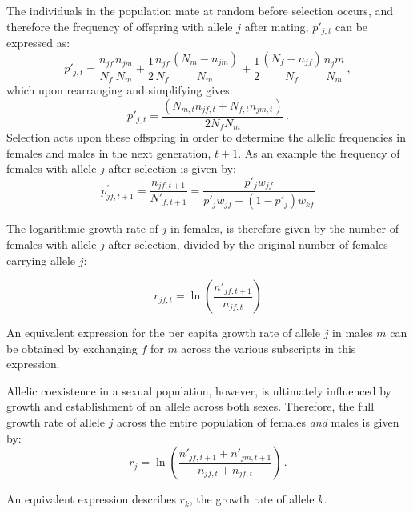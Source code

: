  The individuals in the population mate at random before selection occurs, and therefore the frequency of offspring with allele $j$ after mating, $p'_{j,t}$ can be expressed as:
 \begin{equation}
    p'_{j,t}= \frac{n_{jf}}{N_{f}} \frac{n_{jm}}{N_{m}} + \frac{1}{2} \frac{n_{jf}}{N_{f}} \frac{(N_{m}-n_{jm})}{N_{m}} +\frac{1}{2}
    \frac{(N_{f}-n_{jf})}{N_{f}} \frac{n_jm}{N_{m}} \,,
 \end{equation}
which upon rearranging and simplifying gives:
 \begin{equation}
    p'_{j,t}= \frac{(N_{m,t}n_{jf,t}+ N_{f,t}n_{jm,t})}{2 N_{f}N_{m}} \,.
    \label{pprime}
 \end{equation}
 Selection acts upon these offspring in order to determine the allelic frequencies in females and males in the next generation, $t+1$. As an example the frequency  of females with allele $j$ after selection is given by:
 \begin{equation}
    p^{\prime}_{jf, t+1}= \frac{n_{jf, t+1}}{N'_{f,t+1}} = \frac{p'_{j}w_{jf}}{p'_{j}w_{jf}+ (1-p'_{j})w_{kf}}
    \label{next_gen}
 \end{equation}

 The logarithmic growth rate of $j$ in females, is therefore given by the number of females with allele $j$ after selection, divided by the original number of females carrying allele $j$:



 \begin{equation}
     r_{jf,t} = \ln \left( \frac{n'_{jf, t+1}}{n_{jf,t}} \right)
     \label{canonical}
 \end{equation}

 An equivalent expression for the per capita growth rate of allele $j$ in males $m$ can be obtained by exchanging $f$ for $m$ across the various subscripts in this expression.

 Allelic coexistence in a sexual population, however, is ultimately influenced by growth and establishment of an allele across both sexes. Therefore, the full growth rate of allele $j$ across the entire population of females \emph{and} males is given by:
 \begin{equation}
     r_{j} = \ln \left( \frac{n'_{jf, t+1} + n'_{jm, t+1} }{n_{jf,t} + n_{jf,t} }  \right) \,.
     \label{full}
 \end{equation}

An equivalent expression describes $r_{k}$, the growth rate of allele $k$.

